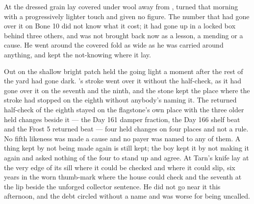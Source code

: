 At  the dressed grain lay covered under wool away from , turned that morning with a progressively lighter touch and given no figure. The number that had gone over it on Bone 10 did not know what it cost; it had gone up  in a locked box behind three others, and was not brought back now as a lesson, a mending or a cause. He went around the covered fold as wide as he was carried around anything, and kept the not-knowing where it lay.

Out on  the shallow bright patch held the going light a moment after the rest of the yard had gone dark. 's stroke went over it without the half-check, as it had gone over it on the seventh and the ninth, and the stone kept the place where the stroke had stopped on the eighth without anybody's naming it. The returned half-check of the eighth stayed on the flagstone's own place with the three older held changes beside it --- the Day 161 damper fraction, the Day 166 shelf beat and the Frost 5 returned beat --- four held changes on four places and not a rule. No fifth likeness was made a cause and no payer was named to any of them. A thing kept by not being made again is still kept; the boy kept it by not making it again and asked nothing of the four to stand up and agree. At  Tarn's knife lay at the very edge of its sill where it could be checked and where it could slip, six years in the worn thumb-mark where the house could check and the seventh at the lip beside the unforged collector sentence. He did not go near it this afternoon, and the debt circled without a name and was worse for being uncalled.


